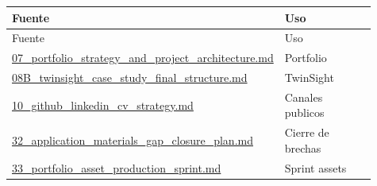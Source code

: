 \begin{center}
\scriptsize
\begin{longtable}{>{\raggedright\arraybackslash}p{0.455\linewidth} >{\raggedright\arraybackslash}p{0.455\linewidth}}
\toprule
Fuente & Uso \\
\midrule
\endfirsthead
\toprule
Fuente & Uso \\
\midrule
\endhead
\href{file:///E:/Laboral/07_portfolio_strategy_and_project_architecture.md}{07\_portfolio\_strategy\_and\_project\_architecture.md} & Portfolio \\
\href{file:///E:/Laboral/08B_twinsight_case_study_final_structure.md}{08B\_twinsight\_case\_study\_final\_structure.md} & TwinSight \\
\href{file:///E:/Laboral/10_github_linkedin_cv_strategy.md}{10\_github\_linkedin\_cv\_strategy.md} & Canales publicos \\
\href{file:///E:/Laboral/32_application_materials_gap_closure_plan.md}{32\_application\_materials\_gap\_closure\_plan.md} & Cierre de brechas \\
\href{file:///E:/Laboral/33_portfolio_asset_production_sprint.md}{33\_portfolio\_asset\_production\_sprint.md} & Sprint assets \\
\bottomrule
\end{longtable}
\end{center}
